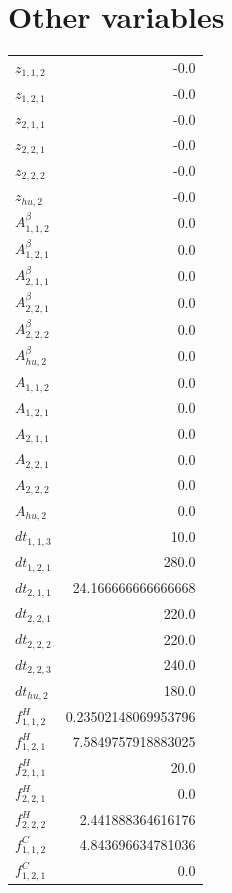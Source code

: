 \documentclass{article}%
\makeatletter
\let\mcnewpage=\newpage%
\newcommand{\TrickSupertabularIntoMulticols}{%
\renewcommand\newpage{%
\if@firstcolumn%
\hrule width\linewidth height0pt%
\columnbreak%
\else%
\mcnewpage%
\fi%
}%
}%
\makeatother
\begin{document}
\section{Other variables}%
\thispagestyle{plain}%
\begin{multicols*}{3}%
\TrickSupertabularIntoMulticols%
%
\begin{supertabular}{lr}%
	$z_{1,1,2}$ & -0.0 \\%
	$z_{1,2,1}$ & -0.0 \\%
	$z_{2,1,1}$ & -0.0 \\%
	$z_{2,2,1}$ & -0.0 \\%
	$z_{2,2,2}$ & -0.0 \\%
	$z_{hu,2}$ & -0.0 \\%
	$A_{1,1,2}^{\beta}$ & 0.0 \\%
	$A_{1,2,1}^{\beta}$ & 0.0 \\%
	$A_{2,1,1}^{\beta}$ & 0.0 \\%
	$A_{2,2,1}^{\beta}$ & 0.0 \\%
	$A_{2,2,2}^{\beta}$ & 0.0 \\%
	$A_{hu,2}^{\beta}$ & 0.0 \\%
	$A_{1,1,2}$ & 0.0 \\%
	$A_{1,2,1}$ & 0.0 \\%
	$A_{2,1,1}$ & 0.0 \\%
	$A_{2,2,1}$ & 0.0 \\%
	$A_{2,2,2}$ & 0.0 \\%
	$A_{hu,2}$ & 0.0 \\%
	$dt_{1,1,3}$ & 10.0 \\%
	$dt_{1,2,1}$ & 280.0 \\%
	$dt_{2,1,1}$ & 24.166666666666668 \\%
	$dt_{2,2,1}$ & 220.0 \\%
	$dt_{2,2,2}$ & 220.0 \\%
	$dt_{2,2,3}$ & 240.0 \\%
	$dt_{hu,2}$ & 180.0 \\%
	$f_{1,1,2}^{H}$ & 0.23502148069953796 \\%
	$f_{1,2,1}^{H}$ & 7.5849757918883025 \\%
	$f_{2,1,1}^{H}$ & 20.0 \\%
	$f_{2,2,1}^{H}$ & 0.0 \\%
	$f_{2,2,2}^{H}$ & 2.441888364616176 \\%
	$f_{1,1,2}^{C}$ & 4.843696634781036 \\%
	$f_{1,2,1}^{C}$ & 0.0 \\%

\end{supertabular}
\end{multicols*}
\end{document}
